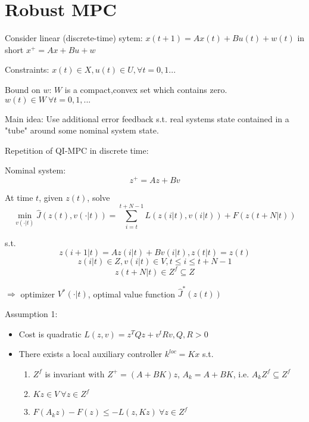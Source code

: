 \section{Robust MPC}

Consider linear (discrete-time) sytem:
$x(t+1) = Ax(t) + Bu(t) + w(t)$
in short $x^+=Ax+Bu+w$

Constraints: $x(t) \in X, u(t) \in U, \forall t = 0,1...$

Bound on $w$:
$W$ is a compact,convex set which contains zero. $w(t) \in W \ \forall t =0,1,...$

Main idea:
Use additional error feedback s.t. real systems state contained in a "tube" around some nominal system state.

Repetition of QI-MPC in discrete time:

Nominal system:
\begin{equation*}
z^+ = Az+Bv
\end{equation*}

At time $t$, given $z(t)$, solve 
\begin{equation*}
\min_{v(\cdot | t)} \hat J(z(t),v(\cdot|t)) = \sum_{i=t}^{t+N-1}L(z(i|t),v(i|t)) + F(z(t+N|t))
\end{equation*} 

s.t. 
\begin{equation*}
z(i+1|t) = Az(i|t)+Bv(i|t), z(t|t) = z(t)
\end{equation*}
\begin{equation*}
z(i|t) \in Z, v(i|t) \in V, t \leq i \leq t+N-1
\end{equation*}
\begin{equation*}
z(t+N|t) \in Z^f \subseteq Z
\end{equation*}

$\Rightarrow$ optimizer $V^*(\cdot|t)$, optimal value function $\hat J^*(z(t))$

Assumption 1:
\begin{itemize}
\item Cost is quadratic $L(z,v) = z^TQz + v^tRv, Q,R > 0$
\item There exists a local auxiliary controller $k^{loc} = Kx$ s.t.
\begin{enumerate}
\item $Z^f$ is invariant with $Z^+=(A+BK)z$, $A_k = A+BK$, i.e. $A_kZ^f \subseteq Z^f$
\item $Kz \in V \  \forall z \in Z^f$
\item $F(A_kz)-F(z) \leq - L(z,Kz) \  \forall z \in Z^f$
\end{enumerate}
\end{itemize}

